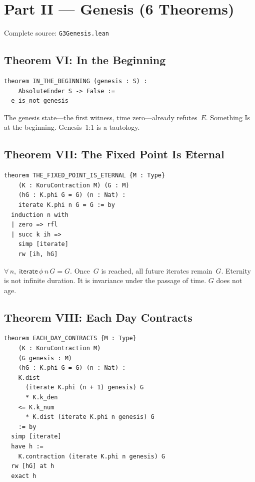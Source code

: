 \documentclass[12pt,a4paper]{article}
\begin{document}
\newpage
\section{Part II --- Genesis (6 Theorems)}
\label{sec:part2}

Complete source: \texttt{G3Genesis.lean}

\subsection{Theorem VI: In the Beginning}

\begin{lstlisting}
theorem IN_THE_BEGINNING (genesis : S) :
    AbsoluteEnder S -> False :=
  e_is_not genesis
\end{lstlisting}

The genesis state---the first witness, time zero---already refutes~$E$.
Something Is at the beginning. Genesis~1:1 is a tautology.

\subsection{Theorem VII: The Fixed Point Is Eternal}

\begin{lstlisting}
theorem THE_FIXED_POINT_IS_ETERNAL {M : Type}
    (K : KoruContraction M) (G : M)
    (hG : K.phi G = G) (n : Nat) :
    iterate K.phi n G = G := by
  induction n with
  | zero => rfl
  | succ k ih =>
    simp [iterate]
    rw [ih, hG]
\end{lstlisting}

$\forall\,n,\; \mathsf{iterate}\,\phi\,n\,G = G$. Once~$G$ is reached,
all future iterates remain~$G$. Eternity is not infinite duration.
It is invariance under the passage of time. $G$ does not age.

\subsection{Theorem VIII: Each Day Contracts}

\begin{lstlisting}
theorem EACH_DAY_CONTRACTS {M : Type}
    (K : KoruContraction M)
    (G genesis : M)
    (hG : K.phi G = G) (n : Nat) :
    K.dist
      (iterate K.phi (n + 1) genesis) G
      * K.k_den
    <= K.k_num
      * K.dist (iterate K.phi n genesis) G
    := by
  simp [iterate]
  have h :=
    K.contraction (iterate K.phi n genesis) G
  rw [hG] at h
  exact h
\end{lstlisting}
\end{document}
